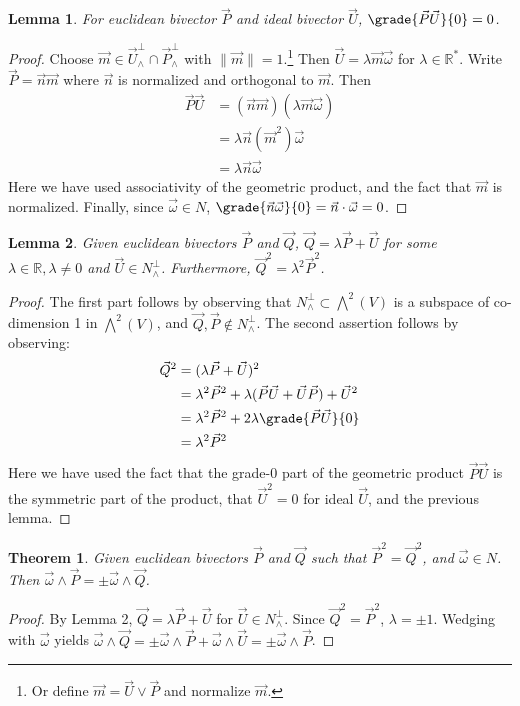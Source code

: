 \documentclass[12pt]{article}
\newtheorem{mythm}{Theorem}
\newtheorem{mylemma}{Lemma}
\begin{document}
\begin{mylemma}
For euclidean bivector $\vec{P}$ and ideal bivector $\vec{U}$, $ \grade{\vec{P}\vec{U}}{0} = 0$.
\end{mylemma}
\begin{proof}
Choose $\vec{m} \in \vec{U}^{\perp}_{\wedge} \cap \vec{P}^{\perp}_{\wedge}$ with $\| \vec{m} \| = 1$.\footnote{Or define $\vec{m} = \vec{U} \vee \vec{P}$ and normalize $\vec{m}$.}  Then $\vec{U} =  \lambda \vec{m} \vec{\omega} $ for $\lambda \in \mathbb{R}^{*}$. Write $\vec{P} =  \vec{n}\vec{m}$ where $\vec{n}$ is normalized and orthogonal to $\vec{m}$.  Then
\begin{align*}
{\vec{P}\vec{U}}&={(\vec{n}\vec{m})(\lambda\vec{m}\vec{\omega})} \\
&=  \lambda{\vec{n}(\vec{m}^{2})\vec{\omega}} \\
&=  \lambda{\vec{n}\vec{\omega}} 
\end{align*}
Here we have used associativity of the geometric product, and the fact that $\vec{m}$ is normalized.  Finally, since $\vec{\omega} \in N$,   $\grade{\vec{n}\vec{\omega}}{0}  = \vec{n} \cdot \vec{\omega} = 0$.
\end{proof}
\begin{mylemma}
Given  euclidean bivectors $\vec{P}$ and $\vec{Q}$, $\vec{Q}  = \lambda \vec{P} + \vec{U}$ for some $ \lambda \in \mathbb{R}, \lambda \neq 0$ and $\vec{U} \in N_{\wedge}^{\perp}$. Furthermore, $\vec{Q}^{2} = \lambda^{2}\vec{P}^{2}$.
\end{mylemma}
\begin{proof}
The first part follows by observing that $N^{\perp}_{\wedge} \subset \bigwedge^{2}(V)$ is a subspace of co-dimension 1 in $\bigwedge^{2}(V)$, and $\vec{Q}, \vec{P} \notin N^{\perp}_{\wedge} $. The second assertion follows by observing:
\begin{align*}
\vec{Q}^{2} &= (\lambda \vec{P} + \vec{U})^{2}\\
&=\lambda^{2} \vec{P}^{2} + \lambda(\vec{P}\vec{U} + \vec{U}\vec{P}) + \vec{U}^{2}\\
&=\lambda^{2}  \vec{P}^{2} + 2 \lambda \grade{\vec{P}\vec{U}}{0} \\
&= \lambda^{2} \vec{P}^{2}
\end{align*} 
Here we have used the fact that the grade-0 part of the geometric product $ \vec{P}\vec{U}$ is the symmetric part of the product, that $\vec{U}^{2}=0$ for ideal $\vec{U}$, and the previous lemma.  
\end{proof}
\begin{mythm}
Given euclidean bivectors $\vec{P}$ and $\vec{Q}$ such that $\vec{P}^{2} = \vec{Q}^{2}$, and $\vec{\omega} \in N$. Then $\vec{\omega} \wedge \vec{P}=\pm \vec{\omega} \wedge \vec{Q}$.  
\end{mythm}
\begin{proof}
By Lemma 2, $\vec{Q} = \lambda \vec{P} + \vec{U}$ for $\vec{U} \in N_{\wedge}^{\perp}$.  Since $\vec{Q}^{2} = \vec{P}^{2}$, $\lambda = \pm 1$.  Wedging with $\vec{\omega}$ yields $\vec{\omega}\wedge \vec{Q} = \pm \vec{\omega} \wedge \vec{P} + \vec{\omega} \wedge \vec{U} = \pm \vec{\omega} \wedge \vec{P}$.
\end{proof}
\end{document}
